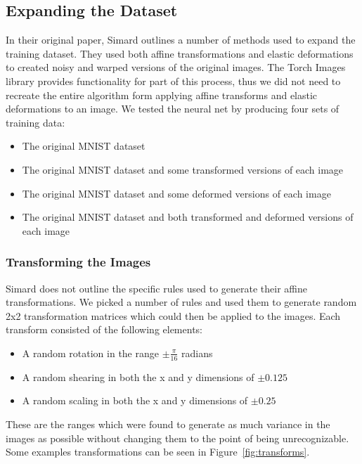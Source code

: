 \documentclass{article}
\begin{document}
\subsection{Expanding the Dataset}
In their original paper, Simard outlines a number of methods used to expand the training dataset. They used both affine transformations and elastic deformations to created noisy and warped versions of the original images. The Torch Images library provides functionality for part of this process, thus we did not need to recreate the entire algorithm form applying affine transforms and elastic deformations to an image. We tested the neural net by producing four sets of training data:
\begin{itemize}
  \item The original MNIST dataset
  \item The original MNIST dataset and some transformed versions of each image
  \item The original MNIST dataset and some deformed versions of each image
  \item The original MNIST dataset and both transformed and deformed versions of each image
\end{itemize}

\subsubsection{Transforming the Images}
Simard does not outline the specific rules used to generate their affine transformations. We picked a number of rules and used them to generate random 2x2 transformation matrices which could then be applied to the images. Each transform consisted of the following elements:
\begin{itemize}
  \item A random rotation in the range $\pm\frac{\pi}{16}$ radians
  \item A random shearing in both the x and y dimensions of $\pm 0.125$
  \item A random scaling in both the x and y dimensions of $\pm 0.25$
\end{itemize}

These are the ranges which were found to generate as much variance in the images as possible without changing them to the point of being unrecognizable. Some examples transformations can be seen in Figure~\ref{fig:transforms}.
\end{document}
